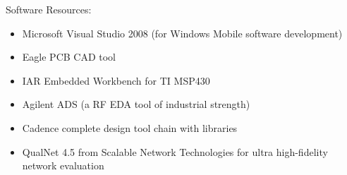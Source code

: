 \noindent Software Resources:
\begin{itemize}
\vspace{-1.5mm}
\item  Microsoft Visual Studio 2008 (for Windows Mobile software development)
\vspace{-1.5mm}
\item Eagle PCB CAD tool
\vspace{-1.5mm}
\item IAR Embedded Workbench for TI MSP430
\vspace{-1.5mm}
\item Agilent ADS (a RF EDA tool of industrial strength)
\vspace{-1.5mm}
\item Cadence complete design tool chain with libraries
\vspace{-1.5mm}
\item QualNet 4.5 from Scalable Network Technologies for ultra high-fidelity network evaluation
\end{itemize}